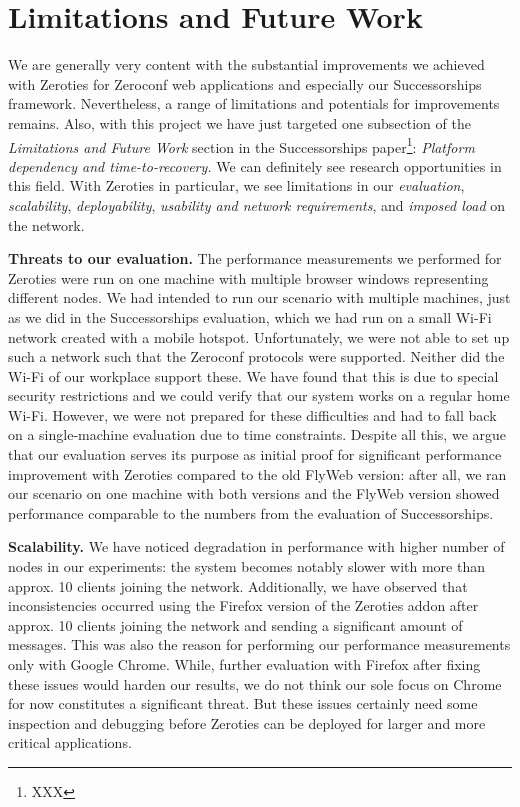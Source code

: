 \section{Limitations and Future Work}
\label{sec:limitations_and_future_work}

We are generally very content with the substantial improvements we achieved with Zeroties for Zeroconf web applications and especially our Successorships framework.
Nevertheless, a range of limitations and potentials for improvements remains.
Also, with this project we have just targeted one subsection of the \textit{Limitations and Future Work} section in the Successorships paper\footnote{XXX}: \textit{Platform dependency and time-to-recovery.}
We can definitely see research opportunities in this field.
With Zeroties in particular, we see limitations in our \textit{evaluation}, \textit{scalability}, \textit{deployability}, \textit{usability and network requirements}, and \textit{imposed load} on the network.

\textbf{Threats to our evaluation.}
The performance measurements we performed for Zeroties were run on one machine with multiple browser windows representing different nodes.
We had intended to run our scenario with multiple machines, just as we did in the Successorships evaluation, which we had run on a small Wi-Fi network created with a mobile hotspot.
Unfortunately, we were not able to set up such a network such that the Zeroconf protocols were supported.
Neither did the Wi-Fi of our workplace support these.
We have found that this is due to special security restrictions and we could verify that our system works on a regular home Wi-Fi.
However, we were not prepared for these difficulties and had to fall back on a single-machine evaluation due to time constraints.
Despite all this, we argue that our evaluation serves its purpose as initial proof for significant performance improvement with Zeroties compared to the old FlyWeb version: after all, we ran our scenario on one machine with both versions and the FlyWeb version showed performance comparable to the numbers from the evaluation of Successorships.

\textbf{Scalability.}
We have noticed degradation in performance with higher number of nodes in our experiments: the system becomes notably slower with more than approx. 10 clients joining the network.
Additionally, we have observed that inconsistencies occurred using the Firefox version of the Zeroties addon after approx. 10 clients joining the network and sending a significant amount of messages.
This was also the reason for performing our performance measurements only with Google Chrome.
While, further evaluation with Firefox after fixing these issues would harden our results, we do not think our sole focus on Chrome for now constitutes a significant threat.
But these issues certainly need some inspection and debugging before Zeroties can be deployed for larger and more critical applications.

